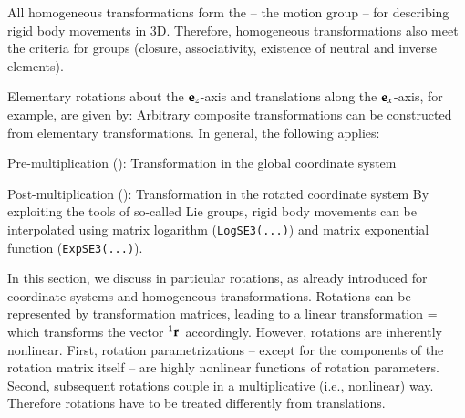 All homogeneous transformations form the  -- the motion group -- for describing rigid body movements in 3D. Therefore, homogeneous transformations also meet the criteria for groups (closure, associativity, existence of neutral and inverse elements).

Elementary rotations about the $\mathbf{e}_z$-axis and translations along the $\mathbf{e}_x$-axis, for example, are given by:
Arbitrary composite transformations can be constructed from elementary transformations. In general, the following applies:
\bi
  \item Pre-multiplication (): Transformation in the global coordinate system
  \item Post-multiplication (): Transformation in the rotated coordinate system
\ei
By exploiting the tools of so-called Lie groups, rigid body movements can be interpolated using matrix logarithm (\texttt{LogSE3(...)}) and matrix exponential function (\texttt{ExpSE3(...)}).




In this section, we discuss in particular rotations, as already introduced for coordinate systems and homogeneous transformations.
Rotations can be represented by transformation matrices, leading to a linear transformation
\be
    =  
\ee
which transforms the vector $\prescript{1}{}{\mathbf{r}}\,$ accordingly.
However, rotations are inherently nonlinear. First, rotation parametrizations -- except for the components of the rotation matrix itself -- are highly nonlinear functions of rotation parameters.
Second, subsequent rotations couple in a multiplicative (i.e., nonlinear) way. Therefore rotations have to be treated differently from translations.


